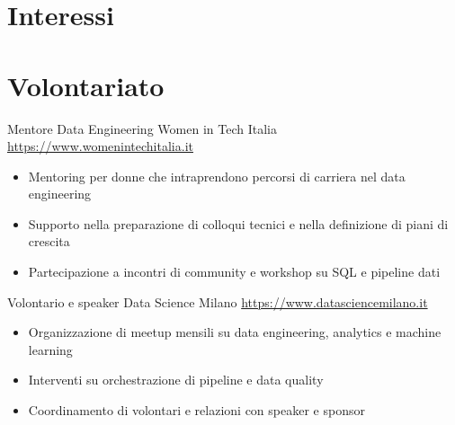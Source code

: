 \documentclass[a4paper, serif, 10pt]{moderncv}
\begin{document}
\section{Interessi}

\section{Volontariato}

        {Mentore Data Engineering}
        {Women in Tech Italia}
        {\url{https://www.womenintechitalia.it}}
        {}
        {\begin{itemize}
\item Mentoring per donne che intraprendono percorsi di carriera nel data engineering
\item Supporto nella preparazione di colloqui tecnici e nella definizione di piani di crescita
\item Partecipazione a incontri di community e workshop su SQL e pipeline dati
\end{itemize}}
    

        {Volontario e speaker}
        {Data Science Milano}
        {\url{https://www.datasciencemilano.it}}
        {}
        {\begin{itemize}
\item Organizzazione di meetup mensili su data engineering, analytics e machine learning
\item Interventi su orchestrazione di pipeline e data quality
\item Coordinamento di volontari e relazioni con speaker e sponsor
\end{itemize}}
    
\end{document}
